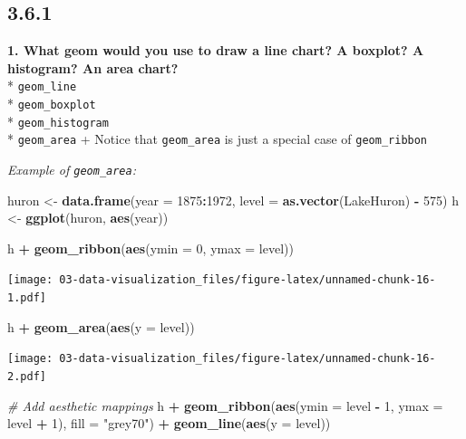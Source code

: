 \documentclass[]{book}
\newenvironment{Shaded}{\begin{snugshade}}{\end{snugshade}}
\newcommand{\CommentTok}[1]{\textcolor[rgb]{0.56,0.35,0.01}{\textit{#1}}}
\newcommand{\DataTypeTok}[1]{\textcolor[rgb]{0.13,0.29,0.53}{#1}}
\newcommand{\DecValTok}[1]{\textcolor[rgb]{0.00,0.00,0.81}{#1}}
\newcommand{\KeywordTok}[1]{\textcolor[rgb]{0.13,0.29,0.53}{\textbf{#1}}}
\newcommand{\NormalTok}[1]{#1}
\newcommand{\OperatorTok}[1]{\textcolor[rgb]{0.81,0.36,0.00}{\textbf{#1}}}
\newcommand{\StringTok}[1]{\textcolor[rgb]{0.31,0.60,0.02}{#1}}
\theoremstyle{definition}
\theoremstyle{definition}
\theoremstyle{definition}
\theoremstyle{remark}
\begin{document}
\hypertarget{section-3}{%
\subsection{3.6.1}\label{section-3}}

\textbf{1. What geom would you use to draw a line chart? A boxplot? A
histogram? An area chart?}\\
* \texttt{geom\_line}\\
* \texttt{geom\_boxplot}\\
* \texttt{geom\_histogram}\\
* \texttt{geom\_area} + Notice that \texttt{geom\_area} is just a
special case of \texttt{geom\_ribbon}

\emph{Example of \texttt{geom\_area}:}

\begin{Shaded}
\begin{Highlighting}[]
\NormalTok{huron <-}\StringTok{ }\KeywordTok{data.frame}\NormalTok{(}\DataTypeTok{year =} \DecValTok{1875}\OperatorTok{:}\DecValTok{1972}\NormalTok{, }\DataTypeTok{level =} \KeywordTok{as.vector}\NormalTok{(LakeHuron) }\OperatorTok{-}\StringTok{ }\DecValTok{575}\NormalTok{)}
\NormalTok{h <-}\StringTok{ }\KeywordTok{ggplot}\NormalTok{(huron, }\KeywordTok{aes}\NormalTok{(year))}

\NormalTok{h }\OperatorTok{+}\StringTok{ }\KeywordTok{geom_ribbon}\NormalTok{(}\KeywordTok{aes}\NormalTok{(}\DataTypeTok{ymin =} \DecValTok{0}\NormalTok{, }\DataTypeTok{ymax =}\NormalTok{ level))}
\end{Highlighting}
\end{Shaded}

\texttt{[image: 03-data-visualization\_files/figure-latex/unnamed-chunk-16-1.pdf]}

\begin{Shaded}
\begin{Highlighting}[]
\NormalTok{h }\OperatorTok{+}\StringTok{ }\KeywordTok{geom_area}\NormalTok{(}\KeywordTok{aes}\NormalTok{(}\DataTypeTok{y =}\NormalTok{ level))}
\end{Highlighting}
\end{Shaded}

\texttt{[image: 03-data-visualization\_files/figure-latex/unnamed-chunk-16-2.pdf]}

\begin{Shaded}
\begin{Highlighting}[]
\CommentTok{# Add aesthetic mappings}
\NormalTok{h }\OperatorTok{+}
\StringTok{  }\KeywordTok{geom_ribbon}\NormalTok{(}\KeywordTok{aes}\NormalTok{(}\DataTypeTok{ymin =}\NormalTok{ level }\OperatorTok{-}\StringTok{ }\DecValTok{1}\NormalTok{, }\DataTypeTok{ymax =}\NormalTok{ level }\OperatorTok{+}\StringTok{ }\DecValTok{1}\NormalTok{), }\DataTypeTok{fill =} \StringTok{"grey70"}\NormalTok{) }\OperatorTok{+}
\StringTok{  }\KeywordTok{geom_line}\NormalTok{(}\KeywordTok{aes}\NormalTok{(}\DataTypeTok{y =}\NormalTok{ level))}
\end{Highlighting}
\end{Shaded}
\end{document}
